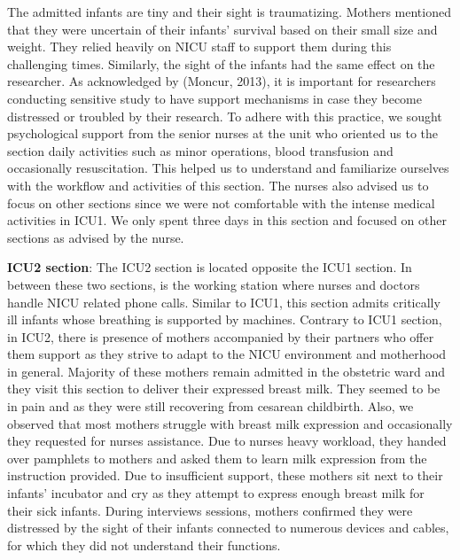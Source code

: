 The admitted infants are tiny and their sight is traumatizing. Mothers mentioned that they were uncertain of their infants' survival based on their small size and weight. They relied heavily on NICU staff to support them during this challenging times. Similarly, the sight of the infants had the same effect on the researcher. As acknowledged by (Moncur, 2013), it is important for researchers conducting sensitive study to have support mechanisms in case they become distressed or troubled by their research. To adhere with this practice, we sought psychological support from the senior nurses at the unit who oriented us to the section daily activities such as minor operations, blood transfusion and occasionally resuscitation. This helped us to understand and familiarize ourselves with the workflow and activities of this section. The nurses also advised us to focus on other sections since we were not comfortable with the intense medical activities in ICU1. We only spent three days in this section and focused on other sections as advised by the nurse.

\textbf{ICU2 section}: The ICU2 section is located opposite the ICU1 section. In between these two sections, is the working station where nurses and doctors handle NICU related phone calls. Similar to ICU1, this section admits critically ill infants whose breathing is supported by machines. Contrary to ICU1 section, in ICU2, there is presence of mothers accompanied by their partners who offer them support as they strive to adapt to the NICU environment and motherhood in general. Majority of these mothers remain admitted in the obstetric ward and they visit this section to deliver their expressed breast milk. They seemed to be in pain and as they were still recovering from cesarean childbirth. Also, we observed that most mothers struggle with breast milk expression and occasionally they requested for nurses assistance. Due to nurses heavy workload, they handed over pamphlets to mothers and asked them to learn milk expression from the instruction provided. Due to insufficient support, these mothers sit next to their infants’ incubator and cry as they attempt to express enough breast milk for their sick infants. During interviews sessions, mothers confirmed they were distressed by the sight of their infants connected to numerous devices and cables, for which they did not understand their functions. 


